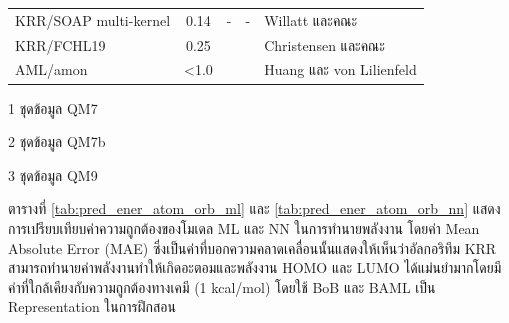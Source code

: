 \begin{table}[H]
\begin{threeparttable}[b]
\begin{tabular}{lcccl}
    KRR/SOAP multi-kernel\tnote{3} &0.14 &- &- &Willatt และคณะ\autocite{willatt2018} \\
    KRR/FCHL19\tnote{3} &0.25 & & &Christensen และคณะ\autocite{christensen2020} \\
    AML/amon\tnote{3} &<1.0 & & &Huang และ von Lilienfeld\autocite{huang2020} \\
    \bottomrule
    \end{tabular}
    \begin{tablenotes}
        \item [1]ชุดข้อมูล QM7
        \item [2]ชุดข้อมูล QM7b
        \item [3]ชุดข้อมูล QM9
      \end{tablenotes}
    \end{threeparttable}
\end{table}

ตารางที่ \ref{tab:pred_ener_atom_orb_ml} และ \ref{tab:pred_ener_atom_orb_nn} แสดงการเปรียบเทียบค่าความถูกต้องของโมเดล
ML และ NN ในการทำนายพลังงาน โดยค่า Mean Absolute Error (MAE) ซึ่งเป็นค่าที่บอกความคลาดเคลื่อนนั้นแสดงให้เห็นว่าอัลกอริทึม KRR 
สามารถทำนายค่าพลังงานทำให้เกิดอะตอมและพลังงาน HOMO และ LUMO ได้แม่นยำมากโดยมีค่าที่ใกล้เคียงกับความถูกต้องทางเคมี (1 kcal/mol) 
โดยใช้ BoB\autocite{huang2016} และ BAML\autocite{faber2017} เป็น Representation ในการฝึกสอน


